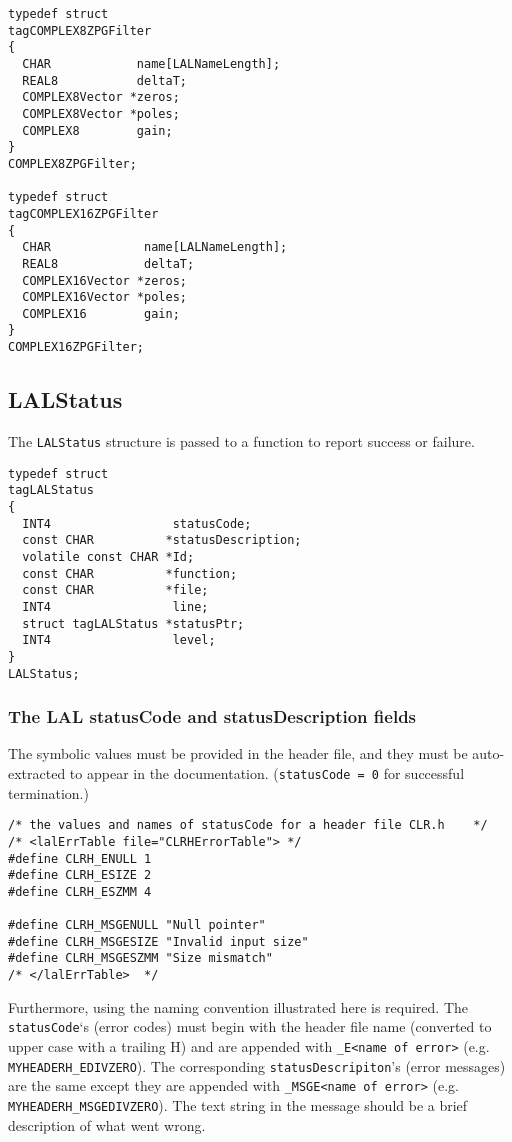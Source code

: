 \documentclass[]{ligodcc}
\renewcommand{\texttt}[1]{{\ttfamily\color{blue}#1}}
\begin{document}
{\footnotesize
\begin{verbatim}
typedef struct
tagCOMPLEX8ZPGFilter
{
  CHAR            name[LALNameLength];
  REAL8           deltaT;
  COMPLEX8Vector *zeros;
  COMPLEX8Vector *poles;
  COMPLEX8        gain;
}
COMPLEX8ZPGFilter;

typedef struct
tagCOMPLEX16ZPGFilter
{
  CHAR             name[LALNameLength];
  REAL8            deltaT;
  COMPLEX16Vector *zeros;
  COMPLEX16Vector *poles;
  COMPLEX16        gain;
}
COMPLEX16ZPGFilter;
\end{verbatim}}





\subsection{ {\texttt {LALStatus}}}
\label{ssec:lalstatus}

The {\tt LALStatus} structure is passed to a function to report
success or failure.
{\footnotesize
\begin{verbatim}
typedef struct
tagLALStatus
{
  INT4                 statusCode;
  const CHAR          *statusDescription;
  volatile const CHAR *Id;
  const CHAR          *function;
  const CHAR          *file;
  INT4                 line;
  struct tagLALStatus *statusPtr;
  INT4                 level;
}
LALStatus;
\end{verbatim}}

\subsubsection{The LAL {\texttt {statusCode}} and 
{\texttt {statusDescription}} fields }

 The symbolic values must be provided in the header file, and they
must  be auto-extracted to appear in the documentation.  
({\tt statusCode = 0} for successful termination.)

{\footnotesize
\begin{verbatim}
/* the values and names of statusCode for a header file CLR.h    */
/* <lalErrTable file="CLRHErrorTable"> */
#define CLRH_ENULL 1
#define CLRH_ESIZE 2
#define CLRH_ESZMM 4
  
#define CLRH_MSGENULL "Null pointer"
#define CLRH_MSGESIZE "Invalid input size"
#define CLRH_MSGESZMM "Size mismatch"
/* </lalErrTable>  */
\end{verbatim}}

Furthermore, using the naming convention illustrated here is required.
The  {\tt statusCode}`s (error codes) must begin with the header file name
(converted to upper case with a trailing H)  and are appended with
{\tt \_E<name of error>} (e.g. {\tt MYHEADERH\_EDIVZERO}). The
corresponding {\tt statusDescripiton}'s (error messages) are the same
except they are appended with {\tt \_MSGE<name of error>} (e.g. {\tt
MYHEADERH\_MSGEDIVZERO}).  The text string in the message should be a
brief description of what went wrong.
\end{document}
